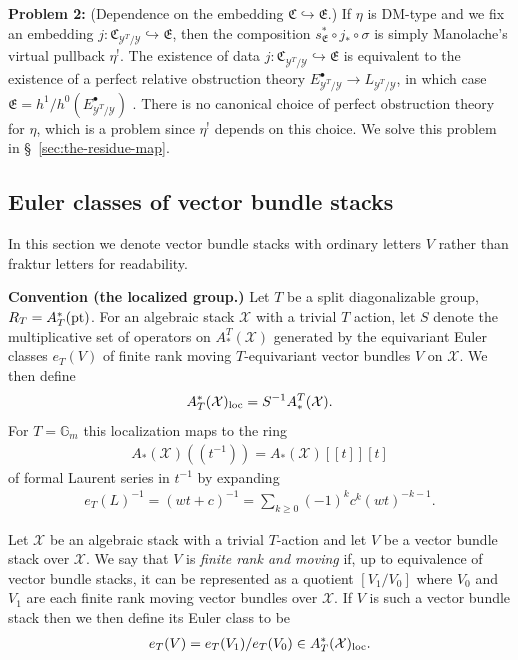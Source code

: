 \documentclass[12pt,dvipsnames]{amsart}
\begin{document}
\bigskip

\noindent\textbf{Problem 2:} (Dependence on the embedding \(\mathfrak C\hookrightarrow \mathfrak E\).) If \(\eta\) is DM-type and we fix an embedding \(j:\mathfrak C_{\mathcal Y^T/\mathcal Y}\hookrightarrow \mathfrak E\), then the composition \(s^*_{\mathfrak E}\circ j_*\circ \sigma\) is simply Manolache's virtual pullback \(\eta^!\). The existence of data \(j:\mathfrak C_{\mathcal Y^T/\mathcal Y}\hookrightarrow \mathfrak E\) is equivalent to the existence of a perfect relative obstruction theory \(E^\bullet_{\mathcal Y^T/\mathcal Y} \to L_{\mathcal Y^T/\mathcal Y}\), in which case \(\mathfrak E = h^1/h^0(E^\bullet_{\mathcal Y^T/\mathcal Y})\) \cite[Proposition 3.11]{manolache_VirtualPullbacks2012}. There is no canonical choice of perfect obstruction theory for \(\eta\), which is a problem since \(\eta^!\) depends on this choice. We solve this problem in \S~\ref{sec:the-residue-map}.

\subsection{Euler classes of vector bundle stacks}\label{sec:euler-classes-of-vector-bundle-stacks}

In this section we denote vector bundle stacks with ordinary letters \(V\) rather than fraktur letters for readability.

\bigskip

\noindent\textbf{Convention (the localized group.)} Let \(T\) be a split diagonalizable group, \(R_T = A^*_T(\operatorname{pt})\). For an algebraic stack \(\mathcal X\) with a trivial \(T\) action, let \(S\) denote the multiplicative set of operators on \(A^T_*(\mathcal X)\) generated by the equivariant Euler classes \(e_T(V)\) of finite rank moving \(T\)-equivariant vector bundles \(V\) on \(\mathcal X\). We then define
\begin{align*}
  A_T^*(\mathcal X)_{\operatorname{loc}} = S^{-1}A^T_*(\mathcal X).
\end{align*}
For \(T = \mathbb G_m\) this localization maps to the ring
\begin{align*}
  A_*(\mathcal X)(\!(t^{-1})\!) = A_*(\mathcal X)[\![t]\!][t]
\end{align*}
of formal Laurent series in \(t^{-1}\) by expanding
\begin{align*}
  e_T(L)^{-1} = (wt + c)^{-1} = \sum_{k\geq 0}(-1)^kc^k(wt)^{-k-1}.
\end{align*}


\begin{definition}\label{defn:euler-class-of-vector-bundle-stack}
  Let \(\mathcal X\) be an algebraic stack with a trivial \(T\)-action and let $V$ be a vector bundle stack over $\mathcal X$. We say that \(V\) is \emph{finite rank and moving} if, up to equivalence of vector bundle stacks, it can be represented as a quotient \([V_1/V_0]\) where \(V_0\) and \(V_1\) are each finite rank moving vector bundles over \(\mathcal X\). If \(V\) is such a vector bundle stack then we then define its Euler class to be
  \begin{align*}
    e_T(V) = e_T(V_1)/e_T(V_0) \in A^*_T(\mathcal X)_{\operatorname{loc}}.
  \end{align*}
\end{definition}
\end{document}
